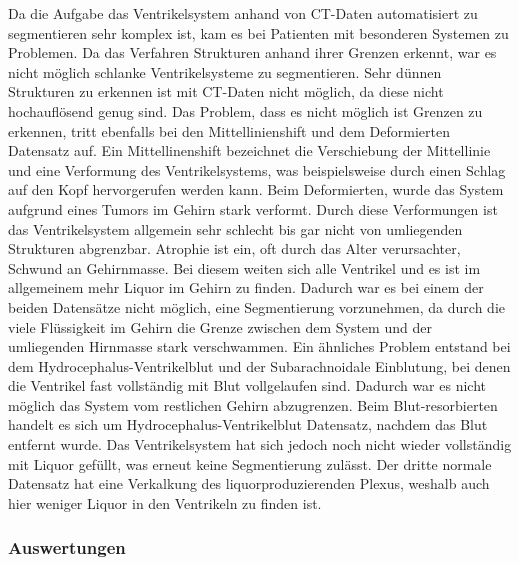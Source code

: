 Da die Aufgabe das Ventrikelsystem anhand von CT-Daten automatisiert zu segmentieren sehr komplex ist, kam es bei Patienten mit besonderen Systemen zu Problemen.
Da das Verfahren Strukturen anhand ihrer Grenzen erkennt, war es nicht möglich schlanke Ventrikelsysteme zu segmentieren. Sehr dünnen Strukturen zu erkennen ist mit CT-Daten nicht möglich, da diese nicht hochauflösend genug sind. Das Problem, dass es nicht möglich ist Grenzen zu erkennen, tritt ebenfalls bei den Mittellinienshift und dem Deformierten Datensatz auf. Ein Mittellinenshift bezeichnet die Verschiebung der Mittellinie und eine Verformung des Ventrikelsystems, was beispielsweise durch einen Schlag auf den Kopf hervorgerufen werden kann. Beim Deformierten, wurde das System aufgrund eines Tumors im Gehirn stark verformt. Durch diese Verformungen ist das Ventrikelsystem allgemein sehr schlecht bis gar nicht von umliegenden Strukturen abgrenzbar.
\newline
Atrophie ist ein, oft durch das Alter verursachter, Schwund an Gehirnmasse. Bei diesem weiten sich alle Ventrikel und es ist im allgemeinem mehr Liquor im Gehirn zu finden. Dadurch war es bei einem der beiden Datensätze nicht möglich, eine Segmentierung vorzunehmen, da durch die viele Flüssigkeit im Gehirn die Grenze zwischen dem System und der umliegenden Hirnmasse stark verschwammen.
Ein ähnliches Problem entstand bei dem Hydrocephalus-Ventrikelblut und der Subarachnoidale Einblutung, bei denen die Ventrikel fast vollständig mit Blut vollgelaufen sind. Dadurch war es nicht möglich das System vom restlichen Gehirn abzugrenzen.
Beim Blut-resorbierten  handelt es sich um Hydrocephalus-Ventrikelblut Datensatz, nachdem das Blut entfernt wurde. Das Ventrikelsystem hat sich jedoch noch nicht wieder vollständig mit Liquor gefüllt, was erneut keine Segmentierung zulässt.
Der dritte normale Datensatz hat eine Verkalkung des liquorproduzierenden Plexus, weshalb auch hier weniger Liquor in den Ventrikeln zu finden ist.



\subsubsection{Auswertungen}

